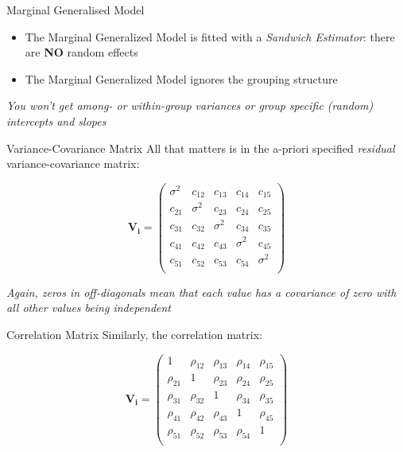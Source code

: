 \documentclass{beamer}
\begin{document}
\begin{frame}{Marginal Generalised Model}
    \begin{itemize}
        \item The Marginal Generalized Model is fitted with a \textit{Sandwich Estimator}: there are \textbf{NO} random effects
        \item The Marginal Generalized Model ignores the grouping structure 
    \end{itemize}

    \textit{You won't get among- or within-group variances or group specific (random) intercepts and slopes}
\end{frame}

\begin{frame}{Variance-Covariance Matrix}
All that matters is in the a-priori specified \textit{residual} variance-covariance matrix:
\vspace{0.3cm}

\begin{equation*}
\mathbf{V_i} = \left( \begin{array}{ccccc}
\sigma^2 & c_{12} & c_{13} & c_{14} & c_{15} \\
c_{21} & \sigma^2 & c_{23} & c_{24} & c_{25} \\
c_{31} & c_{32} & \sigma^2 & c_{34} & c_{35} \\
c_{41} & c_{42} & c_{43} & \sigma^2 & c_{45} \\
c_{51} & c_{52} & c_{53} & c_{54} & \sigma^2 \\
\end{array} \right)
\end{equation*}
\vspace{0.3cm}

\textit{Again, zeros in off-diagonals mean that each value has a covariance of zero with all other values being independent}
\end{frame}

\begin{frame}{Correlation Matrix}
Similarly, the correlation matrix:
\vspace{0.3cm}

\begin{equation*}
\mathbf{V_i} = \left( \begin{array}{ccccc}
1 & \rho_{12} & \rho_{13} & \rho_{14} & \rho_{15} \\
\rho_{21} & 1 & \rho_{23} & \rho_{24} & \rho_{25} \\
\rho_{31} & \rho_{32} & 1 & \rho_{34} & \rho_{35} \\
\rho_{41} & \rho_{42} & \rho_{43} & 1 & \rho_{45} \\
\rho_{51} & \rho_{52} & \rho_{53} & \rho_{54} & 1 \\
\end{array} \right)
\end{equation*}
\end{frame}
\end{document}
